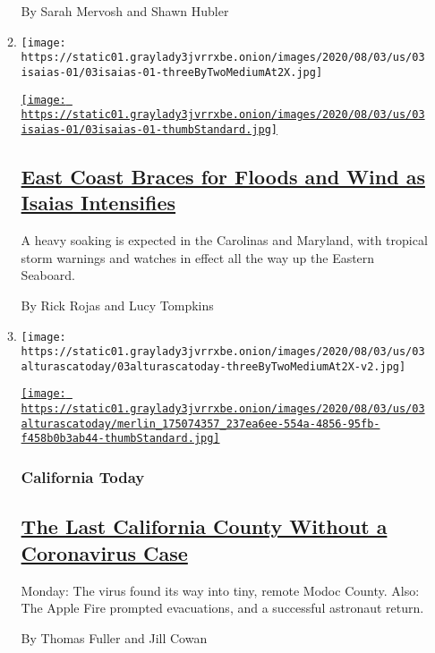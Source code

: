 \begin{enumerate}
\begin{enumerate}
    By Sarah Mervosh and Shawn Hubler
  \item
    \texttt{[image: https://static01.graylady3jvrrxbe.onion/images/2020/08/03/us/03isaias-01/03isaias-01-threeByTwoMediumAt2X.jpg]}

    \href{/2020/08/03/us/isaias-east-coast-landfall.html}{\texttt{[image: https://static01.graylady3jvrrxbe.onion/images/2020/08/03/us/03isaias-01/03isaias-01-thumbStandard.jpg]}}

    \hypertarget{east-coast-braces-for-floods-and-wind-as-isaias-intensifies}{%
    \subsection{\texorpdfstring{\href{/2020/08/03/us/isaias-east-coast-landfall.html}{East
    Coast Braces for Floods and Wind as Isaias
    Intensifies}}{East Coast Braces for Floods and Wind as Isaias Intensifies}}\label{east-coast-braces-for-floods-and-wind-as-isaias-intensifies}}

    A heavy soaking is expected in the Carolinas and Maryland, with
    tropical storm warnings and watches in effect all the way up the
    Eastern Seaboard.

    By Rick Rojas and Lucy Tompkins
  \item
    \texttt{[image: https://static01.graylady3jvrrxbe.onion/images/2020/08/03/us/03alturascatoday/03alturascatoday-threeByTwoMediumAt2X-v2.jpg]}

    \href{/2020/08/03/us/california-coronavirus-modoc-county.html}{\texttt{[image: https://static01.graylady3jvrrxbe.onion/images/2020/08/03/us/03alturascatoday/merlin\_175074357\_237ea6ee-554a-4856-95fb-f458b0b3ab44-thumbStandard.jpg]}}

    \hypertarget{california-today}{%
    \subsubsection{California Today}\label{california-today}}

    \hypertarget{the-last-california-county-without-a-coronavirus-case}{%
    \subsection{\texorpdfstring{\href{/2020/08/03/us/california-coronavirus-modoc-county.html}{The
    Last California County Without a Coronavirus
    Case}}{The Last California County Without a Coronavirus Case}}\label{the-last-california-county-without-a-coronavirus-case}}

    Monday: The virus found its way into tiny, remote Modoc County.
    Also: The Apple Fire prompted evacuations, and a successful
    astronaut return.

    By Thomas Fuller and Jill Cowan
  \end{enumerate}
\end{enumerate}

